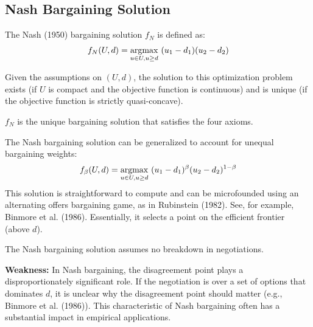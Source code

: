 \documentclass[11pt]{elegantbook_2}
\newcommand{\argmax}{\operatornamewithlimits{argmax}}
\begin{document}
\subsection{Nash Bargaining Solution}
\begin{definition}
    The Nash (1950) bargaining solution $f_N$ is defined as:
    \begin{equation}
        \begin{aligned}
            f_N(U,d)=\argmax_{u\in U, u\geq d}\ (u_1-d_1)(u_2-d_2)
        \end{aligned}
        \nonumber
    \end{equation}
\end{definition}
Given the assumptions on $(U, d)$, the solution to this optimization problem exists (if $U$ is compact and the objective function is continuous) and is unique (if the objective function is strictly quasi-concave).

\begin{theorem}[Nash, 1950]
    $f_N$ is the unique bargaining solution that satisfies the four axioms.
\end{theorem}

The Nash bargaining solution can be generalized to account for unequal bargaining weights:
\begin{equation}
    \begin{aligned}
        f_\beta(U,d)=\argmax_{u\in U, u\geq d}\ (u_1-d_1)^{\beta}(u_2-d_2)^{1-\beta}
    \end{aligned}
    \nonumber
\end{equation}
This solution is straightforward to compute and can be microfounded using an alternating offers bargaining game, as in Rubinstein (1982). See, for example, Binmore et al. (1986). Essentially, it selects a point on the efficient frontier (above $d$).

The Nash bargaining solution assumes no breakdown in negotiations.

\begin{note}
    \textbf{Weakness:} In Nash bargaining, the disagreement point plays a disproportionately significant role. If the negotiation is over a set of options that dominates $d$, it is unclear why the disagreement point should matter (e.g., Binmore et al. (1986)). This characteristic of Nash bargaining often has a substantial impact in empirical applications.
\end{note}
\end{document}
